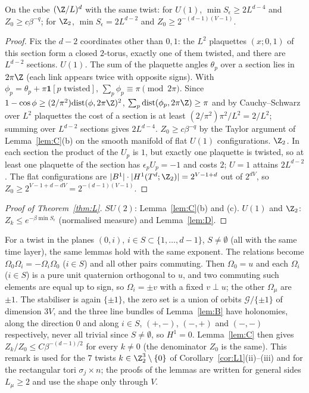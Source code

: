 \begin{lemma}[$U(1)$ and $\Z_2$]\label{lem:D}
On the cube $(\Z/L)^d$ with the same twist: for $U(1)$, $\min S_\epsilon\ge2L^{d-4}$ and $Z_0\ge c\beta^{-q}$; for $\Z_2$, $\min S_\epsilon=2L^{d-2}$ and $Z_0\ge2^{-(d-1)(V-1)}$.
\end{lemma}
\begin{proof}
Fix the $d-2$ coordinates other than $0,1$: the $L^2$ plaquettes $(x;0,1)$ of this section form a closed $2$-torus, exactly one of them twisted, and there are $L^{d-2}$ sections. \emph{$U(1)$.} The sum of the plaquette angles $\theta_p$ over a section lies in $2\pi\Z$ (each link appears twice with opposite signs). With $\phi_p=\theta_p+\pi\mathbf 1[p\text{ twisted}]$, $\sum_p\phi_p\equiv\pi\pmod{2\pi}$. Since $1-\cos\phi\ge(2/\pi^2)\mathrm{dist}(\phi,2\pi\Z)^2$, $\sum_p\mathrm{dist}(\phi_p,2\pi\Z)\ge\pi$ and by Cauchy--Schwarz over $L^2$ plaquettes the cost of a section is at least $(2/\pi^2)\pi^2/L^2=2/L^2$; summing over $L^{d-2}$ sections gives $2L^{d-4}$. $Z_0\ge c\beta^{-q}$ by the Taylor argument of Lemma~\ref{lem:C}(b) on the smooth manifold of flat $U(1)$ configurations. \emph{$\Z_2$.} In each section the product of the $U_p$ is $1$, but exactly one plaquette is twisted, so at least one plaquette of the section has $\epsilon_pU_p=-1$ and costs $2$; $U=1$ attains $2L^{d-2}$. The flat configurations are $|B^1|\cdot|H^1(T^d;\Z_2)|=2^{V-1+d}$ out of $2^{dV}$, so $Z_0\ge2^{V-1+d-dV}=2^{-(d-1)(V-1)}$.
\end{proof}

\begin{proof}[Proof of Theorem~\ref{thm:L}]
$SU(2)$: Lemma~\ref{lem:C}(b) and (c). $U(1)$ and $\Z_2$: $Z_k\le e^{-\beta\min S_\epsilon}$ (normalised measure) and Lemma~\ref{lem:D}.
\end{proof}

\begin{remark}\label{rem:several}
For a twist in the planes $(0,i)$, $i\in S\subset\{1,\dots,d-1\}$, $S\ne\emptyset$ (all with the same time layer), the same lemmas hold with the same exponent. The relations become $\Omega_0\Omega_i=-\Omega_i\Omega_0$ ($i\in S$) and all other pairs commuting. Then $\Omega_0=u$ and each $\Omega_i$ ($i\in S$) is a pure unit quaternion orthogonal to $u$, and two commuting such elements are equal up to sign, so $\Omega_i=\pm v$ with a fixed $v\perp u$; the other $\Omega_\mu$ are $\pm1$. The stabiliser is again $\{\pm1\}$, the zero set is a union of orbits $\mathcal G/\{\pm1\}$ of dimension $3V$, and the three line bundles of Lemma~\ref{lem:B} have holonomies, along the direction $0$ and along $i\in S$, $(+,-)$, $(-,+)$ and $(-,-)$ respectively, never all trivial since $S\ne\emptyset$, so $H^1=0$. Lemma~\ref{lem:C} then gives $Z_k/Z_0\le C\beta^{-(d-1)/2}$ for every $k\ne0$ (the denominator $Z_0$ is the same). This remark is used for the $7$ twists $k\in\Z_2^3\setminus\{0\}$ of Corollary~\ref{cor:L1}(ii)--(iii) and for the rectangular tori $\sigma_j\times n$; the proofs of the lemmas are written for general sides $L_\mu\ge2$ and use the shape only through $V$.
\end{remark}

